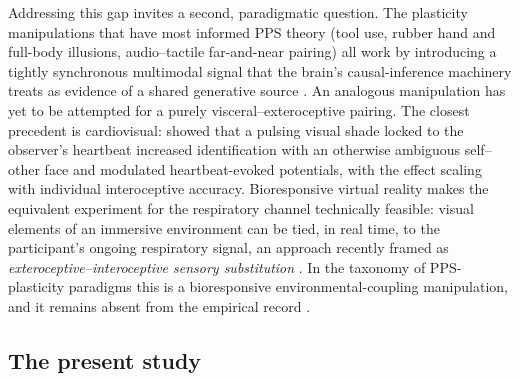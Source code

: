 Addressing this gap invites a second, paradigmatic question. The plasticity manipulations that have most informed PPS theory (tool use, rubber hand and full-body illusions, audio--tactile far-and-near pairing) all work by introducing a tightly synchronous multimodal signal that the brain's causal-inference machinery treats as evidence of a shared generative source \citep{samad_2015, chancel_2021, costantini_2016, parise_2016}. An analogous manipulation has yet to be attempted for a purely visceral--exteroceptive pairing. The closest precedent is cardiovisual: \citet{sel_2016} showed that a pulsing visual shade locked to the observer's heartbeat increased identification with an otherwise ambiguous self--other face and modulated heartbeat-evoked potentials, with the effect scaling with individual interoceptive accuracy. Bioresponsive virtual reality makes the equivalent experiment for the respiratory channel technically feasible: visual elements of an immersive environment can be tied, in real time, to the participant's ongoing respiratory signal, an approach recently framed as \emph{exteroceptive--interoceptive sensory substitution} \citep{Goral2024}. In the taxonomy of PPS-plasticity paradigms this is a bioresponsive environmental-coupling manipulation, and it remains absent from the empirical record \citep{serino2017peripersonal, belli2021breathink, Belli2024}.

\subsection{The present study}



